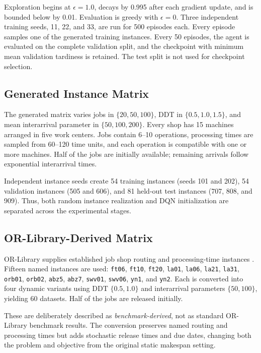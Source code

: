 \documentclass[conference]{IEEEtran}
\begin{document}
Exploration begins at $\epsilon=1.0$, decays by 0.995 after each gradient update, and is bounded below by 0.01. Evaluation is greedy with $\epsilon=0$. Three independent training seeds, 11, 22, and 33, are run for 500 episodes each. Every episode samples one of the generated training instances. Every 50 episodes, the agent is evaluated on the complete validation split, and the checkpoint with minimum mean validation tardiness is retained. The test split is not used for checkpoint selection.

\subsection{Generated Instance Matrix}

The generated matrix varies jobs in $\{20,50,100\}$, DDT in $\{0.5,1.0,1.5\}$, and mean interarrival parameter in $\{50,100,200\}$. Every shop has 15 machines arranged in five work centers. Jobs contain 6--10 operations, processing times are sampled from 60--120 time units, and each operation is compatible with one or more machines. Half of the jobs are initially available; remaining arrivals follow exponential interarrival times.

Independent instance seeds create 54 training instances (seeds 101 and 202), 54 validation instances (505 and 606), and 81 held-out test instances (707, 808, and 909). Thus, both random instance realization and DQN initialization are separated across the experimental stages.

\subsection{OR-Library-Derived Matrix}

OR-Library supplies established job shop routing and processing-time instances \cite{beasley1990orlibrary}. Fifteen named instances are used: \texttt{ft06}, \texttt{ft10}, \texttt{ft20}, \texttt{la01}, \texttt{la06}, \texttt{la21}, \texttt{la31}, \texttt{orb01}, \texttt{orb02}, \texttt{abz5}, \texttt{abz7}, \texttt{swv01}, \texttt{swv06}, \texttt{yn1}, and \texttt{yn2}. Each is converted into four dynamic variants using DDT $\{0.5,1.0\}$ and interarrival parameters $\{50,100\}$, yielding 60 datasets. Half of the jobs are released initially.

These are deliberately described as \emph{benchmark-derived}, not as standard OR-Library benchmark results. The conversion preserves named routing and processing times but adds stochastic release times and due dates, changing both the problem and objective from the original static makespan setting.
\end{document}
